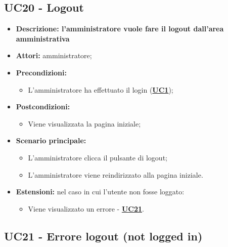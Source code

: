 \subsection{UC20 - Logout}
\label{sec:UC20}
\begin{itemize}
	\item \textbf{Descrizione: l'amministratore vuole fare il logout dall'area amministrativa} 
	\item \textbf{Attori:} amministratore;
	\item \textbf{Precondizioni:} 
	\begin{itemize}
		\item L’amministratore ha effettuato il login (\hyperref[sec:UC1]{\textbf{UC1}});
	\end{itemize}
	\item \textbf{Postcondizioni:} 
	\begin{itemize}
		\item Viene visualizzata la pagina iniziale;
	\end{itemize}
	\item \textbf{Scenario principale:} 
	\begin{itemize}
		\item L’amministratore clicca il pulsante di logout;
		\item L’amministratore viene reindirizzato alla pagina iniziale.
	\end{itemize}
	\item \textbf{Estensioni:} nel caso in cui l'utente non fosse loggato:
	\begin{itemize}
		\item Viene visualizzato un errore - \hyperref[sec:UC21]{\textbf{UC21}}.
	\end{itemize}
\end{itemize}

\subsection{UC21 - Errore logout (not logged in)}
\label{sec:UC21}

